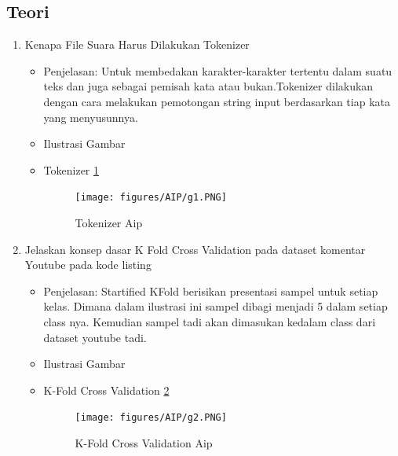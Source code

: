 \subsection{Teori}
\begin{enumerate}
\item Kenapa File Suara Harus Dilakukan Tokenizer
\begin{itemize}
\item Penjelasan: Untuk membedakan karakter-karakter tertentu dalam suatu teks dan juga sebagai pemisah kata atau bukan.Tokenizer dilakukan dengan cara melakukan pemotongan string input berdasarkan tiap kata yang menyusunnya.
\par 
\par
\item Ilustrasi Gambar
\item Tokenizer \ref{teori1}
\begin{figure}[!hbtp]
\centering
\texttt{[image: figures/AIP/g1.PNG]}
\caption{Tokenizer Aip}
\label{teori1}
\end{figure}
\par
\end{itemize}
\par
\par

\item Jelaskan konsep dasar K Fold Cross Validation pada dataset komentar Youtube pada kode listing 

\begin{itemize}
\item Penjelasan: Startified KFold berisikan presentasi sampel untuk setiap kelas. Dimana dalam ilustrasi ini sampel dibagi menjadi 5 dalam setiap class nya. Kemudian sampel tadi akan dimasukan kedalam class dari dataset youtube tadi.
\par 
\par
\item Ilustrasi Gambar
\item K-Fold Cross Validation \ref{teori2}
\begin{figure}[!hbtp]
\centering
\texttt{[image: figures/AIP/g2.PNG]}
\caption{K-Fold Cross Validation Aip}
\label{teori2}
\end{figure}
\par
\end{itemize}
\par
\par


\end{enumerate}
